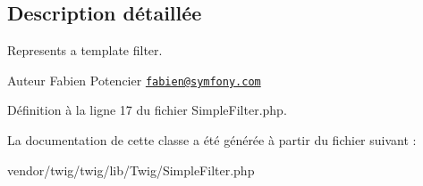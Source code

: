 \subsection{Description détaillée}
Represents a template filter.

\begin{DoxyAuthor}{Auteur}
Fabien Potencier \href{mailto:fabien@symfony.com}{\tt fabien@symfony.\+com} 
\end{DoxyAuthor}


Définition à la ligne 17 du fichier Simple\+Filter.\+php.



La documentation de cette classe a été générée à partir du fichier suivant \+:\begin{DoxyCompactItemize}
\item 
vendor/twig/twig/lib/\+Twig/Simple\+Filter.\+php\end{DoxyCompactItemize}
